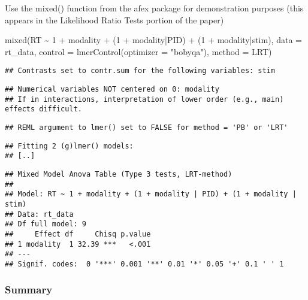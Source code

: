 \documentclass[
]{article}
\newenvironment{Shaded}{\begin{snugshade}}{\end{snugshade}}
\newcommand{\AttributeTok}[1]{\textcolor[rgb]{0.77,0.63,0.00}{#1}}
\newcommand{\DecValTok}[1]{\textcolor[rgb]{0.00,0.00,0.81}{#1}}
\newcommand{\FunctionTok}[1]{\textcolor[rgb]{0.00,0.00,0.00}{#1}}
\newcommand{\NormalTok}[1]{#1}
\newcommand{\SpecialCharTok}[1]{\textcolor[rgb]{0.00,0.00,0.00}{#1}}
\newcommand{\StringTok}[1]{\textcolor[rgb]{0.31,0.60,0.02}{#1}}
\begin{document}
Use the mixed() function from the afex package for demonstration
purposes (this appears in the Likelihood Ratio Tests portion of the
paper)

\begin{Shaded}
\begin{Highlighting}[]
\FunctionTok{mixed}\NormalTok{(RT }\SpecialCharTok{\textasciitilde{}} \DecValTok{1} \SpecialCharTok{+}\NormalTok{ modality }\SpecialCharTok{+} 
\NormalTok{         (}\DecValTok{1} \SpecialCharTok{+}\NormalTok{ modality}\SpecialCharTok{|}\NormalTok{PID) }\SpecialCharTok{+}\NormalTok{ (}\DecValTok{1} \SpecialCharTok{+}\NormalTok{ modality}\SpecialCharTok{|}\NormalTok{stim), }
       \AttributeTok{data =}\NormalTok{ rt\_data, }
       \AttributeTok{control =} \FunctionTok{lmerControl}\NormalTok{(}\AttributeTok{optimizer =} \StringTok{"bobyqa"}\NormalTok{), }
       \AttributeTok{method =} \StringTok{\textquotesingle{}LRT\textquotesingle{}}\NormalTok{)}
\end{Highlighting}
\end{Shaded}

\begin{verbatim}
## Contrasts set to contr.sum for the following variables: stim
\end{verbatim}

\begin{verbatim}
## Numerical variables NOT centered on 0: modality
## If in interactions, interpretation of lower order (e.g., main) effects difficult.
\end{verbatim}

\begin{verbatim}
## REML argument to lmer() set to FALSE for method = 'PB' or 'LRT'
\end{verbatim}

\begin{verbatim}
## Fitting 2 (g)lmer() models:
## [..]
\end{verbatim}

\begin{verbatim}
## Mixed Model Anova Table (Type 3 tests, LRT-method)
## 
## Model: RT ~ 1 + modality + (1 + modality | PID) + (1 + modality | stim)
## Data: rt_data
## Df full model: 9
##     Effect df     Chisq p.value
## 1 modality  1 32.39 ***   <.001
## ---
## Signif. codes:  0 '***' 0.001 '**' 0.01 '*' 0.05 '+' 0.1 ' ' 1
\end{verbatim}

\hypertarget{summary}{%
\subsubsection{Summary}\label{summary}}
\end{document}
